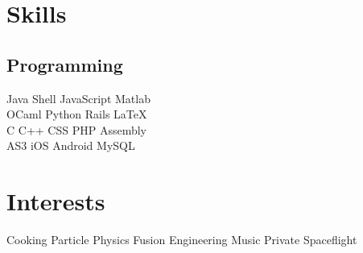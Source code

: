 \documentclass[]{deedy-resume-openfont}
\begin{document}
\begin{minipage}[t]{0.33\textwidth}
    \section{Skills}
        \subsection{Programming}
            Java \textbullet{}
            Shell \textbullet{}
            JavaScript \textbullet{}
            Matlab \\
            OCaml \textbullet{}
            Python \textbullet{}
            Rails \textbullet{}
            \LaTeX\ \\
            C \textbullet{}
            C++ \textbullet{}
            CSS \textbullet{}
            PHP \textbullet{}
            Assembly \\
            AS3 \textbullet{}
            iOS \textbullet{}
            Android \textbullet{}
            MySQL
    \sectionsep

    \section{Interests}
        Cooking \textbullet{}
        Particle Physics \textbullet{}
        Fusion Engineering \textbullet{}
        Music \textbullet{}
        Private Spaceflight \textbullet{}
    \sectionsep

\end{minipage}
\hfill
\end{document}
